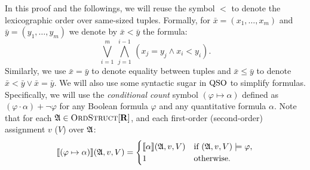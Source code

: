 In this proof and the followings, we will reuse the symbol $<$ to denote the lexicographic order over same-sized tuples. Formally, for $\bar{x} = (x_1,\ldots,x_m)$ and $\bar{y} = (y_1,\ldots,y_m)$ we denote by $\bar{x} < \bar{y}$ the formula:
$$
\bigvee_{i = 1}^m \, \bigwedge_{j = 1}^{i-1} \, (x_j = y_j \wedge x_i < y_i).
$$
Similarly, we use $\bar{x} = \bar{y}$ to denote equality between tuples and $\bar{x} \leq \bar{y}$  to denote $\bar{x} < \bar{y} \vee \bar{x} = \bar{y}$.
We will also use some syntactic sugar in ${\rm QSO}$ to simplify formulas. Specifically, we will use the {\em conditional count} symbol $(\varphi \mapsto \alpha)$ defined as $ (\varphi\cdot\alpha) + \neg\varphi$ for any Boolean formula $\varphi$ and any quantitative formula $\alpha$. Note that for each $\mathfrak{A} \in \text{\sc OrdStruct}[\mathbf{R}]$, and each first-order (second-order) assignment $v$ ($V$) over $\mathfrak{A}$:
\[
{\llbracket{}{(\varphi \mapsto \alpha)}\rrbracket}(\mathfrak{A},v,V) = 
\begin{cases}
{\llbracket{}{\alpha}\rrbracket}(\mathfrak{A},v,V) &\text{if } (\mathfrak{A},v,V)\models\varphi,\\
1 &\text{otherwise}.
\end{cases}
\]

